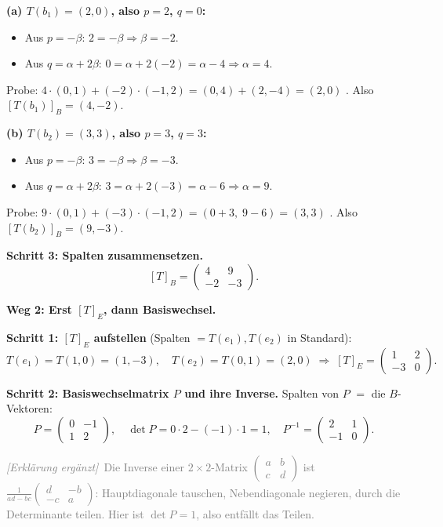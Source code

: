 \documentclass[a4paper,12pt]{article}
\newcommand{\erglerk}{\textcolor{gray}{\small\textit{[Erkl\"arung erg\"anzt]}}}
\begin{document}
\smallskip
\textbf{(a) $T(b_1) = (2, 0)$, also $p = 2$, $q = 0$:}
\begin{itemize}[leftmargin=*, nosep]
    \item Aus $p = -\beta$: \; $2 = -\beta \Rightarrow \beta = -2$.
    \item Aus $q = \alpha + 2\beta$: \; $0 = \alpha + 2(-2) = \alpha - 4 \Rightarrow \alpha = 4$.
\end{itemize}
Probe: $4 \cdot (0,1) + (-2)\cdot(-1,2) = (0, 4) + (2, -4) = (2, 0)$ \checkmark. \quad Also $[T(b_1)]_B = (4, -2)$.

\smallskip
\textbf{(b) $T(b_2) = (3, 3)$, also $p = 3$, $q = 3$:}
\begin{itemize}[leftmargin=*, nosep]
    \item Aus $p = -\beta$: \; $3 = -\beta \Rightarrow \beta = -3$.
    \item Aus $q = \alpha + 2\beta$: \; $3 = \alpha + 2(-3) = \alpha - 6 \Rightarrow \alpha = 9$.
\end{itemize}
Probe: $9 \cdot (0,1) + (-3)\cdot(-1,2) = (0+3,\; 9-6) = (3, 3)$ \checkmark. \quad Also $[T(b_2)]_B = (9, -3)$.

\textbf{Schritt 3: Spalten zusammensetzen.}
\[
[T]_B = \begin{pmatrix} 4 & 9 \\ -2 & -3 \end{pmatrix}.
\]

\bigskip

\textbf{Weg 2: Erst $[T]_E$, dann Basiswechsel.}

\textbf{Schritt 1: $[T]_E$ aufstellen} (Spalten $= T(e_1), T(e_2)$ in Standard):
\[
T(e_1) = T(1,0) = (1, -3), \quad T(e_2) = T(0,1) = (2, 0)
\;\Rightarrow\;
[T]_E = \begin{pmatrix} 1 & 2 \\ -3 & 0 \end{pmatrix}.
\]

\textbf{Schritt 2: Basiswechselmatrix $P$ und ihre Inverse.} Spalten von $P$ $=$ die $B$-Vektoren:
\[
P = \begin{pmatrix} 0 & -1 \\ 1 & 2 \end{pmatrix}, \quad
\det P = 0\cdot 2 - (-1)\cdot 1 = 1, \quad
P^{-1} = \begin{pmatrix} 2 & 1 \\ -1 & 0 \end{pmatrix}.
\]

\erglerk\ \textcolor{gray}{\small Die Inverse einer $2\times 2$-Matrix $\left(\begin{smallmatrix} a & b \\ c & d \end{smallmatrix}\right)$ ist $\frac{1}{ad-bc}\left(\begin{smallmatrix} d & -b \\ -c & a \end{smallmatrix}\right)$: Hauptdiagonale tauschen, Nebendiagonale negieren, durch die Determinante teilen. Hier ist $\det P = 1$, also entf\"allt das Teilen.}
\end{document}
